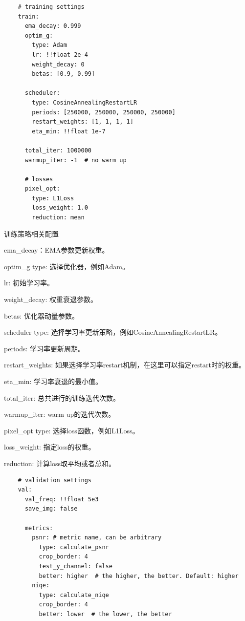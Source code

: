 \documentclass[../main.tex]{subfiles}
\begin{document}
    \begin{verbatim}
    # training settings
    train:
      ema_decay: 0.999
      optim_g:
        type: Adam
        lr: !!float 2e-4
        weight_decay: 0
        betas: [0.9, 0.99]
    
      scheduler:
        type: CosineAnnealingRestartLR
        periods: [250000, 250000, 250000, 250000]
        restart_weights: [1, 1, 1, 1]
        eta_min: !!float 1e-7
    
      total_iter: 1000000
      warmup_iter: -1  # no warm up
    
      # losses
      pixel_opt:
        type: L1Loss
        loss_weight: 1.0
        reduction: mean
	\end{verbatim}
	\begin{exampleBox}[righthand ratio=0.00, sidebyside, sidebyside align=center, lower separated=false]{训练策略相关配置}
	
	ema\_decay：EMA参数更新权重。
	
	optim\_g type: 选择优化器，例如Adam。
	
    lr: 初始学习率。
    
    weight\_decay: 权重衰退参数。
    
    betas: 优化器动量参数。
	
    scheduler type: 选择学习率更新策略，例如CosineAnnealingRestartLR。
    
    periods: 学习率更新周期。
    
    restart\_weights: 如果选择学习率restart机制，在这里可以指定restart时的权重。
    
    eta\_min: 学习率衰退的最小值。
    
    total\_iter: 总共进行的训练迭代次数。
    
    warmup\_iter: warm up的迭代次数。
    
    pixel\_opt type: 选择loss函数，例如L1Loss。
    
    loss\_weight: 指定loss的权重。
    
    reduction: 计算loss取平均或者总和。
    
    \end{exampleBox}
    \begin{verbatim}
    # validation settings
    val:
      val_freq: !!float 5e3
      save_img: false
    
      metrics:
        psnr: # metric name, can be arbitrary
          type: calculate_psnr
          crop_border: 4
          test_y_channel: false
          better: higher  # the higher, the better. Default: higher
        niqe:
          type: calculate_niqe
          crop_border: 4
          better: lower  # the lower, the better
	\end{verbatim}
\end{document}
